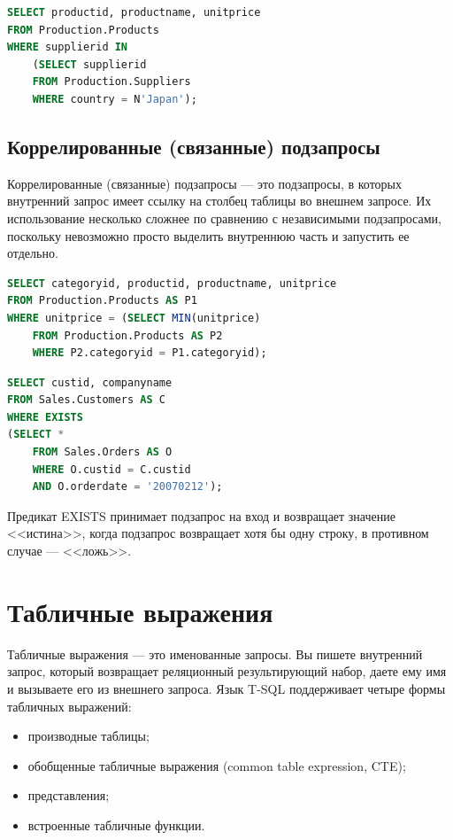 \begin{lstlisting}[label=lst:funcReturn, caption=Пример вложенного запроса с IN, language=sql]
SELECT productid, productname, unitprice
FROM Production.Products
WHERE supplierid IN
	(SELECT supplierid
	FROM Production.Suppliers
	WHERE country = N'Japan'); 
\end{lstlisting}


\subsection{Коррелированные (связанные) подзапросы}

Коррелированные (связанные) подзапросы — это подзапросы, в которых
внутренний запрос имеет ссылку на столбец таблицы во внешнем запросе.
Их использование несколько сложнее по сравнению с независимыми подзапросами, поскольку невозможно просто выделить внутреннюю часть и запустить ее
отдельно.

\begin{lstlisting}[label=lst:funcReturn, language=sql]
SELECT categoryid, productid, productname, unitprice
FROM Production.Products AS P1
WHERE unitprice = (SELECT MIN(unitprice)
	FROM Production.Products AS P2
	WHERE P2.categoryid = P1.categoryid);
	\end{lstlisting}

\begin{lstlisting}[label=lst:funcReturn, language=sql]
SELECT custid, companyname
FROM Sales.Customers AS C
WHERE EXISTS
(SELECT *
	FROM Sales.Orders AS O
	WHERE O.custid = C.custid
	AND O.orderdate = '20070212'); 
\end{lstlisting}
	
Предикат EXISTS принимает подзапрос на вход и возвращает значение <<истина>>,
когда подзапрос возвращает хотя бы одну строку, в противном случае — <<ложь>>. 


\section{Табличные выражения}
Табличные выражения — это именованные запросы. Вы пишете внутренний запрос, который возвращает реляционный результирующий набор, даете ему имя и вызываете его из внешнего запроса. Язык T-SQL поддерживает четыре формы табличных выражений: 

\begin{itemize}
	\item производные таблицы; 
	\item обобщенные табличные выражения (common table expression, CTE);
	\item представления; 
	\item встроенные табличные функции. 
\end{itemize}


